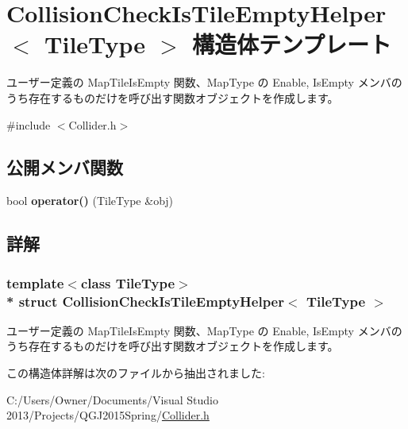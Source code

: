 \hypertarget{struct_collision_check_is_tile_empty_helper}{}\section{Collision\+Check\+Is\+Tile\+Empty\+Helper$<$ Tile\+Type $>$ 構造体テンプレート}
\label{struct_collision_check_is_tile_empty_helper}


ユーザー定義の Map\+Tile\+Is\+Empty 関数、\+Map\+Type の Enable, Is\+Empty メンバのうち存在するものだけを呼び出す関数オブジェクトを作成します。 




{\ttfamily \#include $<$Collider.\+h$>$}

\subsection*{公開メンバ関数}
\begin{DoxyCompactItemize}
\item 
bool {\bfseries operator()} (Tile\+Type \&obj)\hypertarget{struct_collision_check_is_tile_empty_helper_a0f1c765bab040e96802f5049e7073114}{}\label{struct_collision_check_is_tile_empty_helper_a0f1c765bab040e96802f5049e7073114}

\end{DoxyCompactItemize}


\subsection{詳解}
\subsubsection*{template$<$class Tile\+Type$>$\\*
struct Collision\+Check\+Is\+Tile\+Empty\+Helper$<$ Tile\+Type $>$}

ユーザー定義の Map\+Tile\+Is\+Empty 関数、\+Map\+Type の Enable, Is\+Empty メンバのうち存在するものだけを呼び出す関数オブジェクトを作成します。



この構造体詳解は次のファイルから抽出されました\+:\begin{DoxyCompactItemize}
\item 
C\+:/\+Users/\+Owner/\+Documents/\+Visual Studio 2013/\+Projects/\+Q\+G\+J2015\+Spring/\hyperlink{_collider_8h}{Collider.\+h}\end{DoxyCompactItemize}
